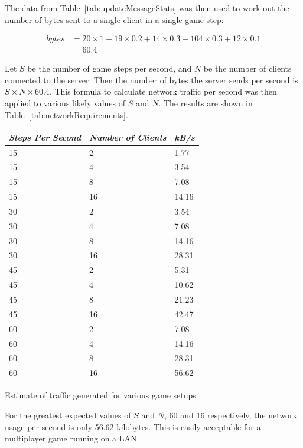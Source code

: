 The data from Table~\ref{tab:updateMessageStats} was then used to work out the number of bytes sent to a single client in a single game step:

\begin{align*}
bytes &= 20 \times 1 + 19 \times 0.2 + 14 \times 0.3 + 104 \times 0.3 + 12 \times 0.1 \\
      &= 60.4
\end{align*}

Let $S$ be the number of game steps per second, and $N$ be the number of clients connected to the server. Then the number of bytes the server sends per second is $S \times N \times 60.4$. This formula to calculate network traffic per second was then applied to various likely values of $S$ and $N$. The results are shown in Table~\ref{tab:networkRequirements}.

\begin{margintable}
    \begin{tabular}{p{5em} p{5em} p{5em}}
    \toprule
    \emph{Steps Per Second} & \emph{Number of Clients} & \emph{kB/s} \\
    \midrule
    15 & 2 & 1.77 \\
    15 & 4 & 3.54 \\
    15 & 8 & 7.08 \\
    15 & 16 & 14.16 \\
    30 & 2 & 3.54 \\
    30 & 4 & 7.08 \\
    30 & 8 & 14.16 \\
    30 & 16 & 28.31 \\
    45 & 2 & 5.31 \\
    45 & 4 & 10.62 \\
    45 & 8 & 21.23 \\
    45 & 16 & 42.47 \\
    60 & 2 & 7.08 \\
    60 & 4 & 14.16 \\
    60 & 8 & 28.31 \\
    60 & 16 & 56.62 \\
    \bottomrule
    \end{tabular}
    	\vspace{1em}
	\caption[Estimation of network requirements]{
	Estimate of traffic generated for various game setups.}
	\label{tab:networkRequirements}
\end{margintable}

For the greatest expected values of $S$ and $N$, 60 and 16 respectively, the network usage per second is only 56.62 kilobytes. This is easily acceptable for a multiplayer game running on a LAN.


